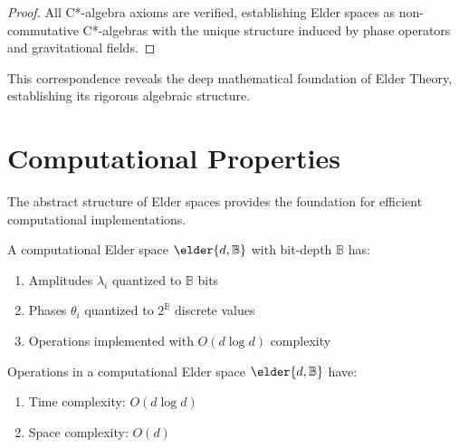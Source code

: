 \begin{proof}
All C*-algebra axioms are verified, establishing Elder spaces as non-commutative C*-algebras with the unique structure induced by phase operators and gravitational fields.
\end{proof}

This correspondence reveals the deep mathematical foundation of Elder Theory, establishing its rigorous algebraic structure.

\section{Computational Properties}

The abstract structure of Elder spaces provides the foundation for efficient computational implementations.

\begin{definition}
\label{def:computational_elder_space}
A computational Elder space $\elder{d, \mathbb{B}}$ with bit-depth $\mathbb{B}$ has:
\begin{enumerate}
    \item Amplitudes $\lambda_i$ quantized to $\mathbb{B}$ bits
    \item Phases $\theta_i$ quantized to $2^{\mathbb{B}}$ discrete values
    \item Operations implemented with $O(d \log d)$ complexity
\end{enumerate}
\end{definition}

\begin{theorem}
\label{thm:complexity_bounds}
Operations in a computational Elder space $\elder{d, \mathbb{B}}$ have:
\begin{enumerate}
    \item Time complexity: $O(d \log d)$
    \item Space complexity: $O(d)$
\end{enumerate}
\end{theorem}

